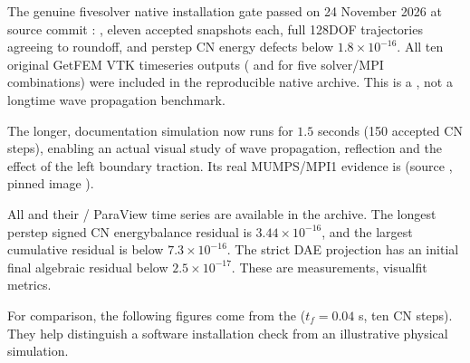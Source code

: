 \documentclass[letterpaper,10pt,english]{sphinxmanual}
\begin{document}
\sphinxAtStartPar
The genuine five\sphinxhyphen{}solver native installation gate passed on 24 November
2026 at source commit : , eleven accepted snapshots each, full 128\sphinxhyphen{}DOF
trajectories agreeing to round\sphinxhyphen{}off, and per\sphinxhyphen{}step CN energy defects below
\(1.8\times 10^{-16}\). All ten original GetFEM VTK time\sphinxhyphen{}series
outputs ( and  for five solver/MPI combinations) were
included in the reproducible native archive. This is a , not a long\sphinxhyphen{}time wave propagation benchmark.

\sphinxAtStartPar
The longer,  documentation simulation now
runs for \(1.5\) seconds (150 accepted CN steps), enabling an
actual visual study of wave propagation, reflection and the
effect of the left boundary traction. Its real MUMPS/MPI1
evidence is 
(source , pinned image
).

\sphinxAtStartPar
All  and their /
ParaView time series are available in the archive.
The longest per\sphinxhyphen{}step signed CN energy\sphinxhyphen{}balance residual is
\(3.44\times 10^{-16}\), and the largest cumulative
residual is below \(7.3\times 10^{-16}\).
The strict DAE projection has an initial final
algebraic residual below \(2.5\times 10^{-17}\).
These are measurements,  visual\sphinxhyphen{}fit metrics.

\sphinxAtStartPar
For comparison, the following figures come from the
(\(t_f=0.04\) s, ten CN steps). They help distinguish a
software installation check from an illustrative physical
simulation.
\end{document}
